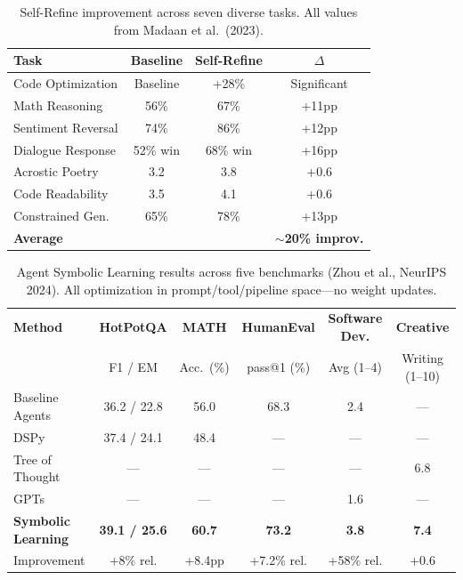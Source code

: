 \begin{table}[t]
\centering
\caption{Self-Refine improvement across seven diverse tasks. All values from Madaan et al.\ (2023).}
\label{tab:bench-selfrefine}
\begin{tabular}{@{}lccc@{}}
\toprule
\textbf{Task} & \textbf{Baseline} & \textbf{Self-Refine} & \textbf{$\Delta$} \\
\midrule
Code Optimization & Baseline & +28\% & Significant \\
Math Reasoning & 56\% & 67\% & +11pp \\
Sentiment Reversal & 74\% & 86\% & +12pp \\
Dialogue Response & 52\% win & 68\% win & +16pp \\
Acrostic Poetry & 3.2 & 3.8 & +0.6 \\
Code Readability & 3.5 & 4.1 & +0.6 \\
Constrained Gen. & 65\% & 78\% & +13pp \\
\midrule
\textbf{Average} & & & \textbf{$\sim$20\% improv.} \\
\bottomrule
\end{tabular}
\end{table}

\begin{table}[t]
\centering
\caption{Agent Symbolic Learning results across five benchmarks (Zhou et al., NeurIPS 2024). All optimization in prompt/tool/pipeline space---no weight updates.}
\label{tab:bench-symbolic}
\begin{tabular}{@{}lccccc@{}}
\toprule
\textbf{Method} & \textbf{HotPotQA} & \textbf{MATH} & \textbf{HumanEval} & \textbf{Software Dev.} & \textbf{Creative} \\
 & F1 / EM & Acc.\ (\%) & pass@1 (\%) & Avg (1--4) & Writing (1--10) \\
\midrule
Baseline Agents & 36.2 / 22.8 & 56.0 & 68.3 & 2.4 & --- \\
DSPy & 37.4 / 24.1 & 48.4 & --- & --- & --- \\
Tree of Thought & --- & --- & --- & --- & 6.8 \\
GPTs & --- & --- & --- & 1.6 & --- \\
\textbf{Symbolic Learning} & \textbf{39.1 / 25.6} & \textbf{60.7} & \textbf{73.2} & \textbf{3.8} & \textbf{7.4} \\
\midrule
Improvement & +8\% rel. & +8.4pp & +7.2\% rel. & +58\% rel. & +0.6 \\
\bottomrule
\end{tabular}
\end{table}


